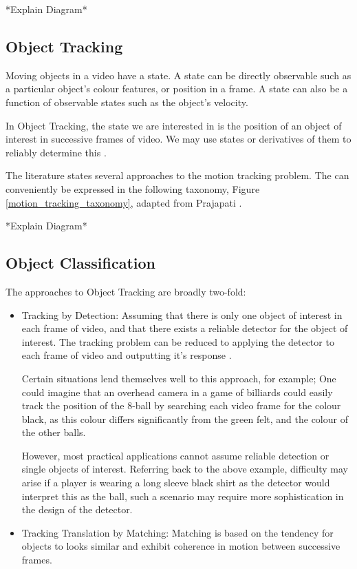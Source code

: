 *Explain Diagram*

\subsection{Object Tracking}
Moving objects in a video have a state. A state can be directly observable such as a
particular object's colour features, or position in a frame. A state can also be a function
of observable states such as the object's velocity.

In Object Tracking, the state we are interested in is the position of an object
of interest in successive frames of video. We may use states or derivatives of
them to reliably determine this \cite{Forsyth2012}.

The literature states several approaches to the motion tracking problem. The can
conveniently be expressed in the following taxonomy, Figure \ref{motion_tracking_taxonomy},
adapted from Prajapati \cite{Prajapati2015}.


*Explain Diagram*



\subsection{Object Classification}

The approaches to Object Tracking are broadly two-fold:
\begin{itemize}
    \item Tracking by Detection:
        Assuming that there is only one object of interest in each frame of
        video, and that there exists a reliable detector for the object of
        interest. The tracking problem can be reduced to applying the detector
        to each frame of video and outputting it's response \cite{Forsyth2012}.

        Certain situations lend themselves well to this approach, for example;
        One could imagine that an overhead camera in a game of billiards could
        easily track the position of the 8-ball by searching each video frame
        for the colour black, as this colour differs significantly from the
        green felt, and the colour of the other balls.
        
        However, most practical applications cannot assume reliable detection or
        single objects of interest. Referring back to the above example,
        difficulty may arise if a player is wearing a long sleeve black shirt as
        the detector would interpret this as the ball, such a scenario may
        require more sophistication in the design of the detector.

    \item Tracking Translation by Matching:
        Matching is based on the tendency for objects to looks similar and
        exhibit coherence in motion between successive frames.
       
        


\end{itemize}   

